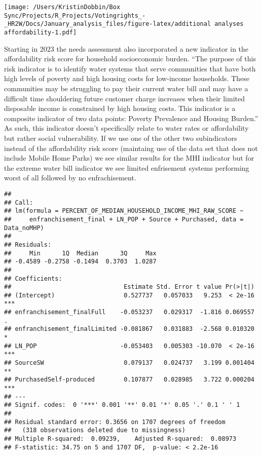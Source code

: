 \documentclass[
]{article}
\begin{document}
\texttt{[image: /Users/KristinDobbin/Box Sync/Projects/R\_Projects/Votingrights\_-\_HR2W/Docs/January\_analysis\_files/figure-latex/additional analyses affordability-1.pdf]}

Starting in 2023 the needs assessment also incorporated a new indicator
in the affordability risk score for household socioeconomic burden.
``The purpose of this risk indicator is to identify water systems that
serve communities that have both high levels of poverty and high housing
costs for low-income households. These communities may be struggling to
pay their current water bill and may have a difficult time shouldering
future customer charge increases when their limited disposable income is
constrained by high housing costs. This indicator is a composite
indicator of two data points: Poverty Prevalence and Housing Burden.''
As such, this indicator doesn't specifically relate to water rates or
affordability but rather social vulnerability. If we use one of the
other two subindicators instead of the affordability risk score
(maintaing use of the data set that does not include Mobile Home Parks)
we see similar results for the MHI indicator but for the extreme water
bill indicator we see limited enfrisement systems performing worst of
all followed by no enfrachisement.

\begin{verbatim}
## 
## Call:
## lm(formula = PERCENT_OF_MEDIAN_HOUSEHOLD_INCOME_MHI_RAW_SCORE ~ 
##     enfranchisement_final + LN_POP + Source + Purchased, data = Data_noMHP)
## 
## Residuals:
##     Min      1Q  Median      3Q     Max 
## -0.4589 -0.2758 -0.1494  0.3703  1.0287 
## 
## Coefficients:
##                               Estimate Std. Error t value Pr(>|t|)    
## (Intercept)                   0.527737   0.057033   9.253  < 2e-16 ***
## enfranchisement_finalFull    -0.053237   0.029317  -1.816 0.069557 .  
## enfranchisement_finalLimited -0.081867   0.031883  -2.568 0.010320 *  
## LN_POP                       -0.053403   0.005303 -10.070  < 2e-16 ***
## SourceSW                      0.079137   0.024737   3.199 0.001404 ** 
## PurchasedSelf-produced        0.107877   0.028985   3.722 0.000204 ***
## ---
## Signif. codes:  0 '***' 0.001 '**' 0.01 '*' 0.05 '.' 0.1 ' ' 1
## 
## Residual standard error: 0.3656 on 1707 degrees of freedom
##   (318 observations deleted due to missingness)
## Multiple R-squared:  0.09239,    Adjusted R-squared:  0.08973 
## F-statistic: 34.75 on 5 and 1707 DF,  p-value: < 2.2e-16
\end{verbatim}
\end{document}
